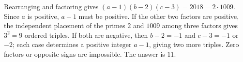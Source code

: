 Rearranging and factoring gives $(a-1)(b-2)(c-3)=2018=2\cdot1009$. Since $a$ is positive, $a-1$ must be positive. If the other two factors are positive, the independent placement of the primes $2$ and $1009$ among three factors gives $3^2=9$ ordered triples. If both are negative, then $b-2=-1$ and $c-3=-1$ or $-2$; each case determines a positive integer $a-1$, giving two more triples. Zero factors or opposite signs are impossible. The answer is $\boxed{11}$.
